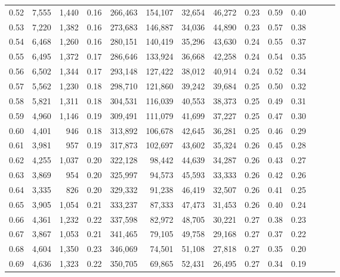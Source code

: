 \begin{tabular}{rrrrrrrrrrrrrr}
0.52 &   7,555 &  1,440 &  0.16 &  266,463 &  154,107 &  32,654 &  46,272 &  0.23 &  0.59 &      0.40 \\
0.53 &   7,220 &  1,382 &  0.16 &  273,683 &  146,887 &  34,036 &  44,890 &  0.23 &  0.57 &      0.38 \\
0.54 &   6,468 &  1,260 &  0.16 &  280,151 &  140,419 &  35,296 &  43,630 &  0.24 &  0.55 &      0.37 \\
0.55 &   6,495 &  1,372 &  0.17 &  286,646 &  133,924 &  36,668 &  42,258 &  0.24 &  0.54 &      0.35 \\
0.56 &   6,502 &  1,344 &  0.17 &  293,148 &  127,422 &  38,012 &  40,914 &  0.24 &  0.52 &      0.34 \\
0.57 &   5,562 &  1,230 &  0.18 &  298,710 &  121,860 &  39,242 &  39,684 &  0.25 &  0.50 &      0.32 \\
0.58 &   5,821 &  1,311 &  0.18 &  304,531 &  116,039 &  40,553 &  38,373 &  0.25 &  0.49 &      0.31 \\
0.59 &   4,960 &  1,146 &  0.19 &  309,491 &  111,079 &  41,699 &  37,227 &  0.25 &  0.47 &      0.30 \\
0.60 &   4,401 &    946 &  0.18 &  313,892 &  106,678 &  42,645 &  36,281 &  0.25 &  0.46 &      0.29 \\
0.61 &   3,981 &    957 &  0.19 &  317,873 &  102,697 &  43,602 &  35,324 &  0.26 &  0.45 &      0.28 \\
0.62 &   4,255 &  1,037 &  0.20 &  322,128 &   98,442 &  44,639 &  34,287 &  0.26 &  0.43 &      0.27 \\
0.63 &   3,869 &    954 &  0.20 &  325,997 &   94,573 &  45,593 &  33,333 &  0.26 &  0.42 &      0.26 \\
0.64 &   3,335 &    826 &  0.20 &  329,332 &   91,238 &  46,419 &  32,507 &  0.26 &  0.41 &      0.25 \\
0.65 &   3,905 &  1,054 &  0.21 &  333,237 &   87,333 &  47,473 &  31,453 &  0.26 &  0.40 &      0.24 \\
0.66 &   4,361 &  1,232 &  0.22 &  337,598 &   82,972 &  48,705 &  30,221 &  0.27 &  0.38 &      0.23 \\
0.67 &   3,867 &  1,053 &  0.21 &  341,465 &   79,105 &  49,758 &  29,168 &  0.27 &  0.37 &      0.22 \\
0.68 &   4,604 &  1,350 &  0.23 &  346,069 &   74,501 &  51,108 &  27,818 &  0.27 &  0.35 &      0.20 \\
0.69 &   4,636 &  1,323 &  0.22 &  350,705 &   69,865 &  52,431 &  26,495 &  0.27 &  0.34 &      0.19 \\

\end{tabular}
